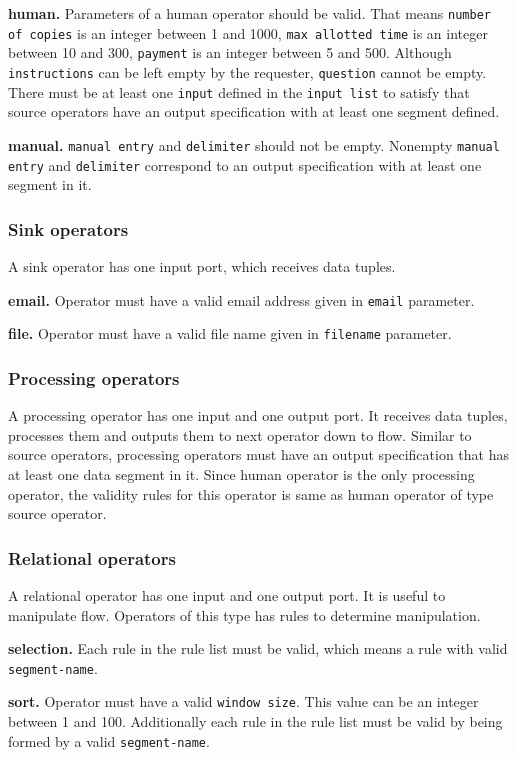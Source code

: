 \textbf{human.} 
Parameters of a human operator should be valid. That means 
\texttt{number of copies} is an integer between 1 and 1000, 
\texttt{max allotted time} is an integer between 10 and 300, 
\texttt{payment} is an integer between 5 and 500. 
Although \texttt{instructions} can be left empty by the requester, \texttt{question} cannot be 
empty. There must be at least one \texttt{input} defined in the \texttt{input list} to satisfy that 
source operators have an output specification with at least one segment defined.

\textbf{manual.} 
\texttt{manual entry} and \texttt{delimiter} should not be empty. Nonempty \texttt{manual entry} 
and \texttt{delimiter} correspond to an output specification with at least one segment in it.

\subsubsection{Sink operators}
A sink operator has one input port, which receives data tuples.

\textbf{email.} 
Operator must have a valid email address given in \texttt{email} parameter.

\textbf{file.} 
Operator must have a valid file name given in \texttt{filename} parameter.

\subsubsection{Processing operators}
A processing operator has one input and one output port. It receives data tuples, processes 
them and outputs them to next operator down to flow. Similar to source operators, processing 
operators must have an output specification that has at least one data segment in it. Since 
human operator is the only processing operator, the validity rules for this operator is same as 
human operator of type source operator.

\subsubsection{Relational operators}
A relational operator has one input and one output port. It is useful to manipulate flow. 
Operators of this type has rules to determine manipulation.

\textbf{selection.}
Each rule in the rule list must be valid, which means a rule with valid \texttt{segment-name}.

\textbf{sort.}
Operator must have a valid \texttt{window size}. This value can be an integer between 
1 and 100. Additionally each rule in the rule list must be valid by being formed by a valid 
\texttt{segment-name}.

